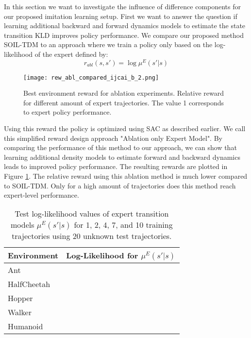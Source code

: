\documentclass{article}
\begin{document}
In this section we want to investigate the influence of difference components for our proposed imitation learning setup. First we want to answer the question if learning additional backward and forward dynamics models to estimate the state transition KLD improves policy performance. We compare our proposed method SOIL-TDM to an approach where we train a policy only based on the log-likelihood of the expert defined by:
\begin{equation} \label{eq:ablReward}
r_{abl}(s,s')=\log \mu^E(s'|s)    
\end{equation}

\begin{figure}
\texttt{[image: rew\_abl\_compared\_ijcai\_b\_2.png]}
\caption{Best environment reward for ablation experiments. Relative reward for different amount of expert trajectories. The value 1 corresponds to expert policy performance.}
\label{fig:reward_abl_plot}
\end{figure}

Using this reward the policy is optimized using SAC as described earlier. We call this simplified reward design approach "Ablation only Expert Model". By comparing the performance of this method to our approach, we can show that learning additional density models to estimate forward and backward dynamics leads to improved policy performance. The resulting rewards are plotted in Figure \ref{fig:reward_abl_plot}. The relative reward using this ablation method is much lower compared to SOIL-TDM. Only for a high amount of trajectories does this method reach expert-level performance.

\begin{table}
	\renewcommand{\arraystretch}{1.3}
	\centering
	\caption{Test log-likelihood values of expert transition models $\mu^E(s'|s)$ for 1, 2, 4, 7, and 10 training trajectories using 20 unknown test trajectories.}\label{tb:abl1}
	\begin{small}
	\begin{tabular}{l|c}
		Environment & Log-Likelihood for $\mu^E(s'|s)$  \\\hline
		Ant & \makecell{$38.5, 43.5, 54.2, 59.9, 62.7$} \\
		HalfCheetah & \makecell{$45.5,47.8,70.2, 71.1,71.3$} \\
		Hopper & \makecell{$14.4,13.8,15.9, 40.7,36.9$}  \\
		Walker & \makecell{$38.9,47.4,62.5, 65.2,67.4$} \\
		Humanoid &  \makecell{$39.5,50.9,62.9,77.7,77.4$}\\
	\end{tabular}
	\end{small}
\end{table}
\end{document}
